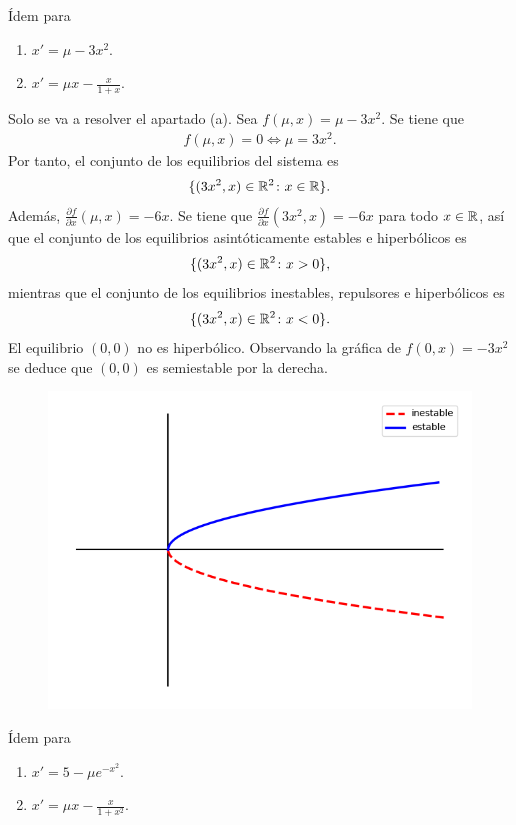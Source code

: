\documentclass[11pt]{report}
\begin{document}
\begin{exercise}
    Ídem para
    \begin{enumerate}
        \item $x' = \mu - 3x^2$.
        \item $x' = \mu x - \frac{x}{1+x}$.
    \end{enumerate}
\end{exercise}

\begin{solution}
    Solo se va a resolver el apartado (a). Sea $f(\mu,x) = \mu-3x^2$. Se tiene que
    \begin{align*}
        f(\mu,x) = 0 \iff \mu = 3x^2.
    \end{align*}
    Por tanto, el conjunto de los equilibrios del sistema es
    \[\{(3x^2,x) \in\mathbb R^2 \colon x \in \mathbb R\}.\]
    Además, $\frac{\partial f}{\partial x}(\mu,x) = -6x$. Se tiene que $\frac{\partial f}{\partial x}(3x^2,x) = -6x$ para todo $x \in \mathbb R$, así que el conjunto de los equilibrios asintóticamente estables e hiperbólicos es
    \[\{(3x^2,x) \in\mathbb R^2 \colon x > 0\},\]
    mientras que el conjunto de los equilibrios inestables, repulsores e hiperbólicos es
    \[\{(3x^2,x) \in\mathbb R^2 \colon x < 0\}.\] 
    El equilibrio $(0,0)$ no es hiperbólico. Observando la gráfica de $f(0,x) = -3x^2$ se deduce que $(0,0)$ es semiestable por la derecha.
    \begin{figure}[H]
        \centering
        \includegraphics[scale=0.5]{img/11.png}
    \end{figure}
\end{solution}

\begin{exercise}
    Ídem para
    \begin{enumerate}
        \item $x' = 5-\mu e^{-x^2}$.
        \item $x' = \mu x -\frac{x}{1+x^2}$.
    \end{enumerate}
\end{exercise}
\end{document}
